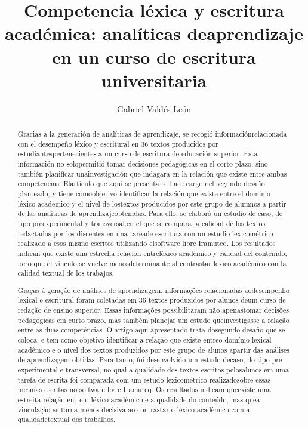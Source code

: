 \documentclass{textolivre}
\title{Competencia léxica y escritura académica: analíticas deaprendizaje en un curso de escritura universitaria}
\author[1]{Gabriel Valdés-León}
\affil[1]{Universidad de Las Palmas de Gran Canaria, Espanha. Email: \url{gvaldesl@ucsh.cl}. \orcid{0000-0001-8807-8838}}
\begin{document}
\maketitle

\begin{poliabstract}
\begin{abstract}
Gracias a la generación de analíticas de aprendizaje, se recogió
informaciónrelacionada con el desempeño léxico y escritural en 36 textos
producidos por estudiantespertenecientes a un curso de escritura de educación
superior. Esta información no solopermitió tomar decisiones pedagógicas en el
corto plazo, sino también planificar unainvestigación que indagara en la
relación que existe entre ambas competencias. Elartículo que aquí se presenta
se hace cargo del segundo desafío planteado, y tiene comoobjetivo identificar
la relación que existe entre el dominio léxico académico y el nivel de
lostextos producidos por este grupo de alumnos a partir de las analíticas de
aprendizajeobtenidas. Para ello, se elaboró un estudio de caso, de tipo
preexperimental y transversal,en el que se compara la calidad de los textos
redactados por los discentes en una tareade escritura con un estudio
lexicométrico realizado a esos mismo escritos utilizando elsoftware libre
Iramuteq. Los resultados indican que existe una estrecha relación entreléxico
académico y calidad del contenido, pero que el vínculo se vuelve
menosdeterminante al contrastar léxico académico con la calidad textual de los
trabajos.

\end{abstract}

\begin{portuguese}
\begin{abstract}
Graças à geração de análises de aprendizagem, informações relacionadas
aodesempenho lexical e escritural foram coletadas em 36 textos produzidos por
alunos deum curso de redação de ensino superior. Essas informações
possibilitaram não apenastomar decisões pedagógicas em curto prazo, mas também
planejar um estudo queinvestigasse a relação entre as duas competências. O
artigo aqui apresentado trata dosegundo desafio que se coloca, e tem como
objetivo identificar a relação que existe entreo domínio lexical acadêmico e o
nível dos textos produzidos por este grupo de alunos apartir das análises de
aprendizagem obtidas. Para tanto, foi desenvolvido um estudo decaso, do tipo
pré-experimental e transversal, no qual a qualidade dos textos escritos
pelosalunos em uma tarefa de escrita foi comparada com um estudo lexicométrico
realizadosobre essas mesmas escritas no software livre Iramuteq. Os resultados
indicam queexiste uma estreita relação entre o léxico acadêmico e a qualidade
do conteúdo, mas quea vinculação se torna menos decisiva ao contrastar o léxico
acadêmico com a qualidadetextual dos trabalhos.


\end{abstract}
\end{portuguese}
\end{poliabstract}
\end{document}
